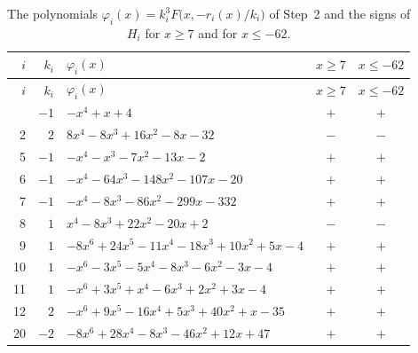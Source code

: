 \documentclass[11pt]{article}
\begin{document}
\begingroup\footnotesize
\setlength{\LTcapwidth}{\textwidth}
\begin{longtable}{@{}rrlcc@{}}
\caption{The polynomials $\varphi_i(x)=k_i^3F\bigl(x,-r_i(x)/k_i\bigr)$ of Step~2 and the signs of $H_i$ for $x\geq7$ and for $x\leq-62$.}\label{tab:phi}\\
\hline $i$ & $k_i$ & $\varphi_i(x)$ & $x\geq7$ & $x\leq-62$\\\hline\endfirsthead\hline $i$ & $k_i$ & $\varphi_i(x)$ & $x\geq7$ & $x\leq-62$\\\hline\endhead\hline\endfoot
0 & $-1$ & $-x^{4}+x+4$ & $+$ & $+$\\
2 & $2$ & $8x^{4}-8x^{3}+16x^{2}-8x-32$ & $-$ & $-$\\
5 & $-1$ & $-x^{4}-x^{3}-7x^{2}-13x-2$ & $+$ & $+$\\
6 & $-1$ & $-x^{4}-64x^{3}-148x^{2}-107x-20$ & $+$ & $+$\\
7 & $-1$ & $-x^{4}-8x^{3}-86x^{2}-299x-332$ & $+$ & $+$\\
8 & $1$ & $x^{4}-8x^{3}+22x^{2}-20x+2$ & $-$ & $-$\\
9 & $1$ & $-8x^{6}+24x^{5}-11x^{4}-18x^{3}+10x^{2}+5x-4$ & $+$ & $+$\\
10 & $1$ & $-x^{6}-3x^{5}-5x^{4}-8x^{3}-6x^{2}-3x-4$ & $+$ & $+$\\
11 & $1$ & $-x^{6}+3x^{5}+x^{4}-6x^{3}+2x^{2}+3x-4$ & $+$ & $+$\\
12 & $2$ & $-x^{6}+9x^{5}-16x^{4}+5x^{3}+40x^{2}+x-35$ & $+$ & $+$\\
20 & $-2$ & $-8x^{6}+28x^{4}-8x^{3}-46x^{2}+12x+47$ & $+$ & $+$\\
\end{longtable}
\endgroup
\end{document}
